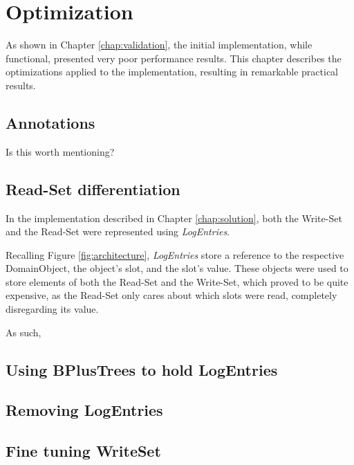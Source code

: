 \chapter{Optimization}

As shown in Chapter \ref{chap:validation}, the initial implementation,
while functional, presented very poor performance results. This
chapter describes the optimizations applied to the implementation,
resulting in remarkable practical results.

\section{Annotations}

Is this worth mentioning?

\section{Read-Set differentiation}

In the implementation described in Chapter \ref{chap:solution}, both
the Write-Set and the Read-Set were represented using {\it LogEntries}.

Recalling Figure \ref{fig:architecture}, {\it LogEntries} store a
reference to the respective DomainObject, the object's slot, and the
slot's value. These objects were used to store elements of both the
Read-Set and the Write-Set, which proved to be quite expensive, as the
Read-Set only cares about which slots were read, completely
disregarding its value.

As such, 


\section{Using BPlusTrees to hold LogEntries}

\section{Removing LogEntries}

\section{Fine tuning WriteSet}


